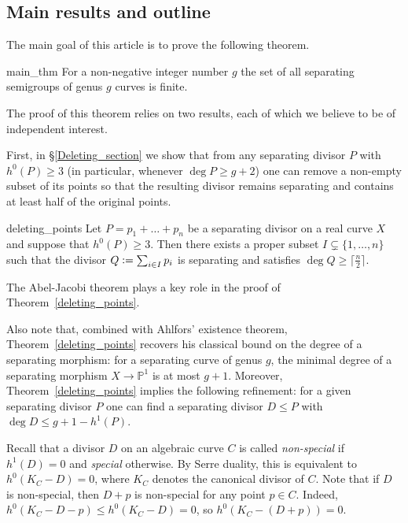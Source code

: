 \documentclass[x11names,oneside,11pt]{amsart}
\theoremstyle{definition}
\theoremstyle{remark}
\newcommand{\eqdef}{\vcentcolon=}
\newcommand{\PP}{\mathbb{P}}
\begin{document}
  \subsection*{Main results and outline} The main goal of this article is to prove the following theorem.

  \begin{reptheorem}{main_thm}
    For a non-negative integer number $g$ the set of all separating semigroups of genus $g$ curves is finite. 
  \end{reptheorem}

  The proof of this theorem relies on two results, each of which we believe to be of independent interest.

  First, in \S\ref{Deleting_section} we show that from any separating divisor $P$ with $h^0(P) \geqslant 3$ (in particular, whenever $\deg P \geqslant g+2$) one can remove a non-empty subset of its points so that the resulting divisor remains separating and contains at least half of the original points.

  \begin{reptheorem}{deleting_points}
    Let $P = p_1 + \ldots + p_n$ be a separating divisor on a real curve $X$ and suppose that $h^0(P) \geqslant 3$. Then there exists a proper subset  $I \subsetneq \{ 1, \ldots, n\}$ such that the divisor $Q \eqdef \sum_{i \in I} p_i$ is separating and satisfies $\deg{Q} \geqslant \lceil \frac{n}{2} \rceil$. 
  \end{reptheorem}
  
  The Abel-Jacobi theorem plays a key role in the proof of Theorem~\ref{deleting_points}. 

  Also note that, combined with Ahlfors' existence theorem, Theorem~\ref{deleting_points} recovers his classical bound on the degree of a separating morphism: for a separating curve of genus $g$, the minimal degree of a separating morphism $X \to \PP^1$ is at most $g+1$. Moreover, Theorem~\ref{deleting_points} implies the following refinement: for a given separating divisor $P$ one can find a separating divisor $D \leqslant P$ with $\deg{D} \leqslant g+1 - h^1(P)$.

  \medskip 

  Recall that a divisor $D$ on an algebraic curve $C$ is called \emph{non-special} if $h^1(D) = 0$ and \emph{special} otherwise.  By Serre duality, this is equivalent to $h^0(K_C - D) = 0$, where $K_C$ denotes the canonical divisor of $C$.  Note that if $D$ is non-special, then $D + p$ is non-special for any point $p \in C$. Indeed, $h^0(K_C - D - p) \leqslant h^0(K_C-D)=0$, so $h^0(K_C -(D+p))=0$. 
\end{document}
